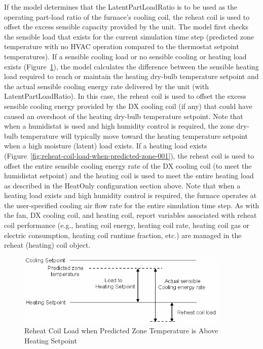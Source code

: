 If the model determines that the LatentPartLoadRatio is to be used as the operating part-load ratio of the furnace's cooling coil, the reheat coil is used to offset the excess sensible capacity provided by the unit. The model first checks the sensible load that exists for the current simulation time step (predicted zone temperature with no HVAC operation compared to the thermostat setpoint temperatures). If a sensible cooling load or no sensible cooling or heating load exists (Figure~\ref{fig:reheat-coil-load-when-predicted-zone}), the model calculates the difference between the sensible heating load required to reach or maintain the heating dry-bulb temperature setpoint and the actual sensible cooling energy rate delivered by the unit (with LatentPartLoadRatio). In this case, the reheat coil is used to offset the excess sensible cooling energy provided by the DX cooling coil (if any) that could have caused an overshoot of the heating dry-bulb temperature setpoint. Note that when a humidistat is used and high humidity control is required, the zone dry-bulb temperature will typically move toward the heating temperature setpoint when a high moisture (latent) load exists. If a heating load exists (Figure~\ref{fig:reheat-coil-load-when-predicted-zone-001}), the reheat coil is used to offset the entire sensible cooling energy rate of the DX cooling coil (to meet the humidistat setpoint) and the heating coil is used to meet the entire heating load as described in the HeatOnly configuration section above. Note that when a heating load exists and high humidity control is required, the furnace operates at the user-specified cooling air flow rate for the entire simulation time step. As with the fan, DX cooling coil, and heating coil, report variables associated with reheat coil performance (e.g., heating coil energy, heating coil rate, heating coil gas or electric consumption, heating coil runtime fraction, etc.) are managed in the reheat (heating) coil object.

\begin{figure}[hbtp] %
\centering
\includegraphics[width=0.9\textwidth, height=0.9\textheight, keepaspectratio=true]{media/image5050.png}
\caption{Reheat Coil Load when Predicted Zone Temperature is Above Heating Setpoint \protect \label{fig:reheat-coil-load-when-predicted-zone}}
\end{figure}

